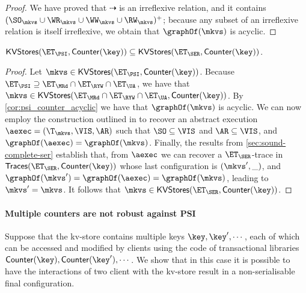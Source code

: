 \begin{proof}
We have proved that $\dashrightarrow$ is an irreflexive relation, and it contains $(\SO_{\mkvs} \cup \WR_{\mkvs} \cup \WW_{\mkvs} \cup \RW_{\mkvs})^+$; 
because any subset of an irreflexive relation is itself irreflexive, we obtain that $\graphOf(\mkvs)$ is acyclic.
\end{proof}

\begin{corollary}
$\mathsf{KVStores}(\ET_{\PSI}, \mathsf{Counter}(\key)) \subseteq \mathsf{KVStores}(\ET_{\SER}, \mathsf{Counter}(\key))$. 
\end{corollary}

\begin{proof}
Let $\mkvs \in \mathsf{KVStores}(\ET_{\PSI}, \mathsf{Counter}(\key))$. Because $\ET_{\PSI} \supseteq \ET_{\MRd} \cap \ET_{\RYW} \cap \ET_{\UA}$, 
we have that $\mkvs \in \mathsf{KVStores}(\ET_{\MRd} \cap \ET_{\RYW} \cap \ET_{\UA}, \mathsf{Counter}(\key))$. 
By \cref{cor:psi_counter_acyclic} we have that $\graphOf(\mkvs)$ is acyclic. We can now employ the construction 
outlined in \cite{laws} to recover an abstract execution $\aexec = (\T_{\mkvs}, \VIS, \AR)$ such that $\SO \subseteq \VIS$ and $\AR \subseteq \VIS$, 
and $\graphOf(\aexec) = \graphOf(\mkvs)$.
Finally, the results from \cref{sec:sound-complete-ser} establish that, from $\aexec$ we can recover a $\ET_{\SER}$-trace in 
$\mathsf{Traces}(\ET_{\SER}, \mathsf{Counter}(\key))$ 
whose last configuration is $(\mkvs', \_)$, and 
$\graphOf(\mkvs') = \graphOf(\aexec) = \graphOf(\mkvs)$, leading to $\mkvs' = \mkvs$. It follows that $\mkvs \in 
\mathsf{KVStores}(\ET_{\SER}, \mathsf{Counter}(\key))$.
\end{proof}

\paragraph{Multiple counters are not robust against PSI}
Suppose that the kv-store contains multiple keys $\key, \key', \cdots$, each of which 
can be accessed and modified by clients using the code of transactional libraries 
$\mathsf{Counter}(\key), \mathsf{Counter}(\key'), \cdots$. We show that in this
 case it is possible to have the interactions of two client with the kv-store result 
 in  a non-serialisable final configuration. 
 
